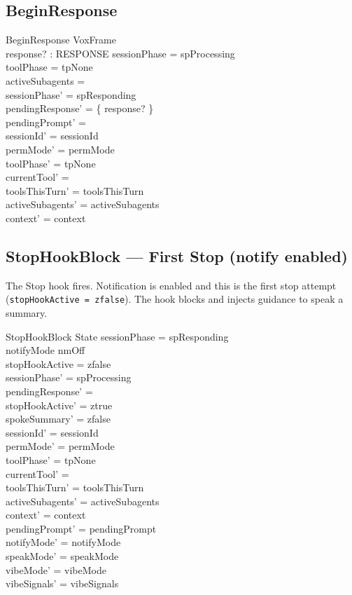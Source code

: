 \documentclass[a4paper,10pt,fleqn]{article}
\begin{document}
\subsection{BeginResponse}

\begin{schema}{BeginResponse}
  VoxFrame \\
  response? : RESPONSE
  \where
  sessionPhase = spProcessing \\
  toolPhase = tpNone \\
  activeSubagents = \emptyset \\
  sessionPhase' = spResponding \\
  pendingResponse' = \{ response? \} \\
  pendingPrompt' = \emptyset \\
  sessionId' = sessionId \\
  permMode' = permMode \\
  toolPhase' = tpNone \\
  currentTool' = \emptyset \\
  toolsThisTurn' = toolsThisTurn \\
  activeSubagents' = activeSubagents \\
  context' = context
\end{schema}

\subsection{StopHookBlock --- First Stop (notify enabled)}

The Stop hook fires. Notification is enabled and this is the first
stop attempt (\texttt{stopHookActive = zfalse}). The hook blocks
and injects guidance to speak a summary.

\begin{schema}{StopHookBlock}
  \Delta State
  \where
  sessionPhase = spResponding \\
  notifyMode \neq nmOff \\
  stopHookActive = zfalse \\
  sessionPhase' = spProcessing \\
  pendingResponse' = \emptyset \\
  stopHookActive' = ztrue \\
  spokeSummary' = zfalse \\
  sessionId' = sessionId \\
  permMode' = permMode \\
  toolPhase' = tpNone \\
  currentTool' = \emptyset \\
  toolsThisTurn' = toolsThisTurn \\
  activeSubagents' = activeSubagents \\
  context' = context \\
  pendingPrompt' = pendingPrompt \\
  notifyMode' = notifyMode \\
  speakMode' = speakMode \\
  vibeMode' = vibeMode \\
  vibeSignals' = vibeSignals
\end{schema}
\end{document}
